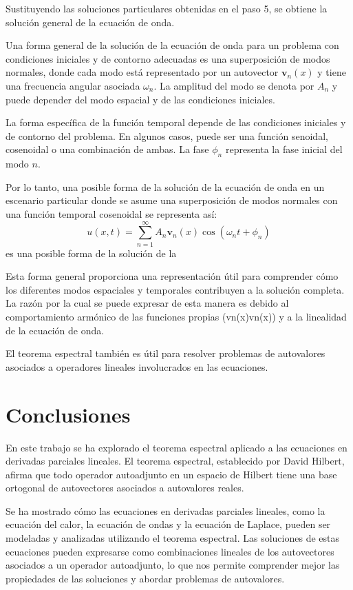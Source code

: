 \documentclass{article}
\begin{document}
    Sustituyendo las soluciones particulares obtenidas en el paso 5, se obtiene la solución general de la ecuación de onda.

    Una forma general de la solución de la ecuación de onda para un problema con condiciones iniciales y de contorno adecuadas es una superposición de modos normales, donde cada modo está representado por un autovector $\mathbf{v}_n(x)$ y tiene una frecuencia angular asociada $\omega_n$. La amplitud del modo se denota por $A_n$ y puede depender del modo espacial y de las condiciones iniciales.

    La forma específica de la función temporal depende de las condiciones iniciales y de contorno del problema. En algunos casos, puede ser una función senoidal, cosenoidal o una combinación de ambas. La fase $\phi_n$ representa la fase inicial del modo $n$.

    Por lo tanto, una posible forma de la solución de la ecuación de onda en un escenario particular donde se asume una superposición de modos normales con una función temporal cosenoidal se representa así: 
    \begin{equation} 
        u(x, t) = \sum_{n=1}^{\infty} A_n \mathbf{v}_n(x) \cos(\omega_n t + \phi_n) 
    \end{equation} es una posible forma de la solución de la 
    
    Esta forma general proporciona una representación útil para comprender cómo los diferentes modos espaciales y temporales contribuyen a la solución completa. La razón por la cual se puede expresar de esta manera es debido al comportamiento armónico de las funciones propias (vn(x)vn(x)) y a la linealidad de la ecuación de onda.

    El teorema espectral también es útil para resolver problemas de autovalores asociados a operadores lineales involucrados en las ecuaciones.

\newpage

\section{Conclusiones}

En este trabajo se ha explorado el teorema espectral aplicado a las ecuaciones en derivadas parciales lineales. El teorema espectral, establecido por David Hilbert, afirma que todo operador autoadjunto en un espacio de Hilbert tiene una base ortogonal de autovectores asociados a autovalores reales.

Se ha mostrado cómo las ecuaciones en derivadas parciales lineales, como la ecuación del calor, la ecuación de ondas y la ecuación de Laplace, pueden ser modeladas y analizadas utilizando el teorema espectral. Las soluciones de estas ecuaciones pueden expresarse como combinaciones lineales de los autovectores asociados a un operador autoadjunto, lo que nos permite comprender mejor las propiedades de las soluciones y abordar problemas de autovalores.
\end{document}

